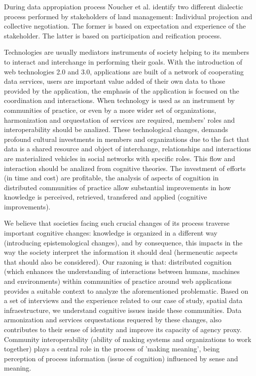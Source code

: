 \documentclass[10pt,twocolumn,ieeetran]{article}
\begin{document}
During data appropiation process Noucher et al. \cite{Noucher1} identify two different dialectic process  performed by stakeholders of land management: Individual projection and collective negotiation.
The former is based on expectation and experience of the stakeholder. The latter is based on participation
and reification process. 



Technologies are usually mediators instruments of society helping to its members to interact and interchange in performing their goals. With the introduction of web technologies 2.0 and 3.0, applications are built  of a network of cooperating data services, users are important value added of their own data to those provided by the application, the emphasis of the application is focused on the coordination and interactions. 
When technology is used as an instrument by communities of practice, or even by a more wider set of organizations, harmonization and orquestation of services are required, members' roles and interoperability should be analized. 
These technological changes, demands profound cultural investments in members and organizations due to the fact that data is a shared resource and object of interchange, relationships and interactions are materialized vehicles in social networks with specific roles. This flow and interaction should be analized from cognitive theories. The investment of efforts (in time and cost) are profitable, the analysis of aspects of cognition in distributed communities of practice allow substantial improvements in how knowledge is perceived, retrieved, transfered and applied (cognitive improvements).


We believe that societies facing such crucial changes of its process traverse important cognitive changes: knowledge is organized in a different way (introducing epistemological changes), and by consequence, this impacts in the way the society interpret the information it should deal (hermeneutic aspects that should also be considered). Our razoning is that: distributed cognition (which enhances the understanding of interactions between humans, machines and environments) within communities of practice around web applications provides a suitable context to analyze the aforementioned problematic. Based on a set of interviews and the experience related to our case of study, spatial data infraestructure, we understand cognitive issues inside these communities. Data armonization and services orquestations requered by these changes, also contributes to their sense of identity and improve its capacity of agency proxy. Community interoperability (ability of making systems and organizations to work together) plays a central role in the process of 'making meaning',
being perception of process information (issue of cognition) influenced by sense and meaning. 
\end{document}

